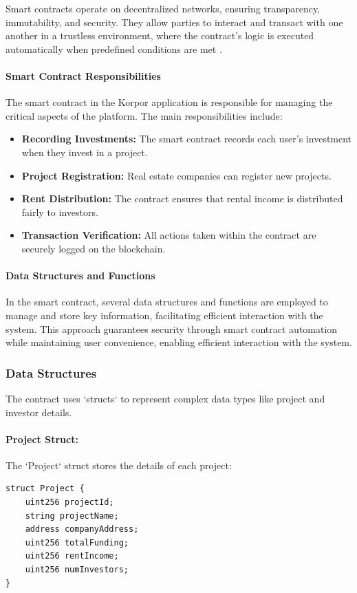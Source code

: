 Smart contracts operate on decentralized networks, ensuring transparency, immutability, and security. They allow parties to interact and transact with one another in a trustless environment, where the contract's logic is executed automatically when predefined conditions are met \cite{Wohrer2018SmartContractApplications}.

\paragraph{Smart Contract Responsibilities}

The smart contract in the Korpor application is responsible for managing the critical aspects of the platform. The main responsibilities include:

\begin{itemize}
    \item \textbf{Recording Investments:} The smart contract records each user's investment when they invest in a project.
    \item \textbf{Project Registration:} Real estate companies can register new projects.
    \item \textbf{Rent Distribution:} The contract ensures that rental income is distributed fairly to investors.
    \item \textbf{Transaction Verification:} All actions taken within the contract are securely logged on the blockchain.
\end{itemize}

\paragraph{Data Structures and Functions}

In the smart contract, several data structures and functions are employed to manage and store key information, facilitating efficient interaction with the system. This approach guarantees security through smart contract automation while maintaining user convenience, enabling efficient interaction with the system.

\subsubsection{Data Structures}

The contract uses `structs` to represent complex data types like project and investor details.

\paragraph{Project Struct:}
The `Project` struct stores the details of each project:
\begin{verbatim}
struct Project {
    uint256 projectId;
    string projectName;
    address companyAddress;
    uint256 totalFunding;
    uint256 rentIncome;
    uint256 numInvestors;
}
\end{verbatim}

